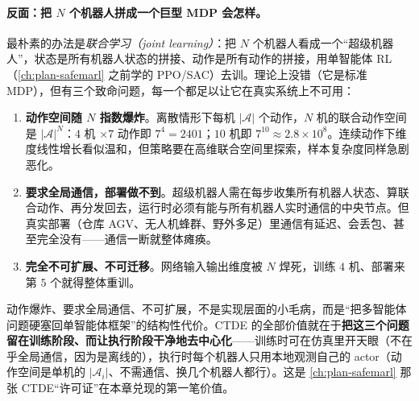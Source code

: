 \paragraph{反面：把 $N$ 个机器人拼成一个巨型 MDP 会怎样。}
最朴素的办法是\emph{联合学习（joint learning）}：把 $N$ 个机器人看成一个“超级机器人”，状态是所有机器人状态的拼接、动作是所有动作的拼接，用单智能体 RL（\cref{ch:plan-safemarl} 之前学的 PPO/SAC）去训。理论上没错（它是标准 MDP），但有三个致命问题，每一个都足以让它在真实系统上不可用：

\begin{enumerate}
  \item \textbf{动作空间随 $N$ 指数爆炸}。离散情形下每机 $|\mathcal{A}|$ 个动作，$N$ 机的联合动作空间是 $|\mathcal{A}|^N$：$4$ 机 $\times 7$ 动作即 $7^4=2401$；$10$ 机即 $7^{10}\approx 2.8\times10^8$。连续动作下维度线性增长看似温和，但策略要在高维联合空间里探索，样本复杂度同样急剧恶化。
  \item \textbf{要求全局通信，部署做不到}。超级机器人需在每步收集所有机器人状态、算联合动作、再分发回去，运行时必须有能与所有机器人实时通信的中央节点。但真实部署（仓库 AGV、无人机蜂群、野外多足）里通信有延迟、会丢包、甚至完全没有——通信一断就整体瘫痪。
  \item \textbf{完全不可扩展、不可迁移}。网络输入输出维度被 $N$ 焊死，训练 $4$ 机、部署来第 $5$ 个就得整体重训。
\end{enumerate}

\begin{insight}
动作爆炸、要求全局通信、不可扩展，不是实现层面的小毛病，而是“把多智能体问题硬塞回单智能体框架”的结构性代价。CTDE 的全部价值就在于\textbf{把这三个问题留在训练阶段、而让执行阶段干净地去中心化}——训练时可在仿真里开天眼（不在乎全局通信，因为是离线的），执行时每个机器人只用本地观测自己的 actor（动作空间是单机的 $|\mathcal{A}_i|$、不需通信、换几个机器人都行）。这是 \cref{ch:plan-safemarl} 那张 CTDE“许可证”在本章兑现的第一笔价值。
\end{insight}

